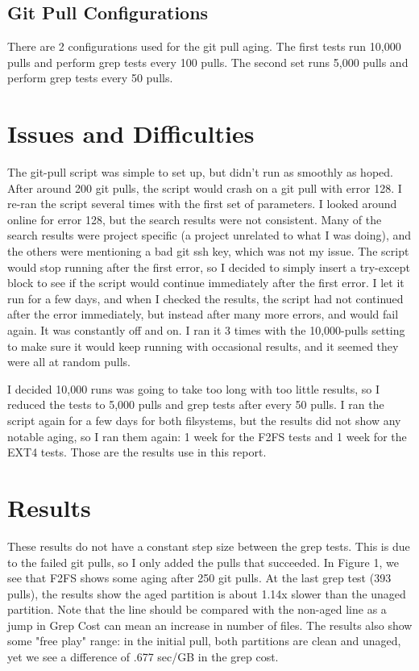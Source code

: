 \documentclass[a4paper, 10pt, conference]{ieeeconf}
\begin{document}
\subsection*{Git Pull Configurations}
There are 2 configurations used for the git pull aging. The first
tests run 10,000 pulls and perform grep tests every 100 pulls. 
The second set runs 5,000 pulls and perform grep tests every 50 pulls.

\section{Issues and Difficulties}
The git-pull script was simple to set up, but didn't run as smoothly as hoped. 
After around 200 git pulls, the script would crash on a git pull with error
128. I re-ran the script several times with the first set of parameters.
I looked around online for error 128, but the search results were not 
consistent. Many of the search results were project specific (a project 
unrelated to what I was doing), and the others were mentioning a bad git ssh 
key, which was not my issue. The script would stop running after the first 
error, so I decided to simply insert a try-except block to see if the script
would continue immediately after the first error. I let it run for a few days, 
and when I checked the results, the script had not continued after the error
immediately, but instead after many more errors, and would fail again. It was
constantly off and on. I ran it 3 times with the 10,000-pulls setting to make
sure it would keep running with occasional results, and it seemed they were 
all at random pulls. 

I decided 10,000 runs was going to take too long with too little results, so I
reduced the tests to 5,000 pulls and grep tests after every 50 pulls. I ran
the script again for a few days for both filsystems, but the results did not 
show any notable aging, so I ran them again: 1 week for the F2FS tests and 1 
week for the EXT4 tests. Those are the results use in this report. 

\section{Results}
These results do not have a constant step size between the grep tests. This
is due to the failed git pulls, so I only added the pulls that succeeded. In 
Figure 1, we see that F2FS shows some aging after 250 git pulls. At the last
grep test (393 pulls), the results show the aged partition is about 1.14x 
slower than the unaged partition. Note that
the line should be compared with the non-aged line as a jump in Grep Cost can
mean an increase in number of files. The results also show some "free play" 
range: in the initial pull, both partitions are clean and unaged, yet we see
a difference of .677 sec/GB in the grep cost.
\end{document}
